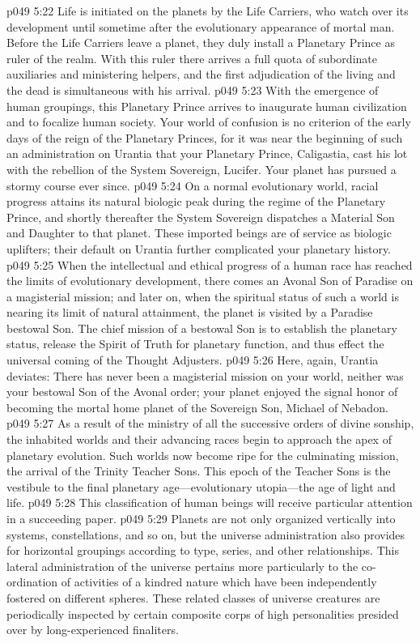 \vs p049 5:22 Life is initiated on the planets by the Life Carriers, who watch over its development until sometime after the evolutionary appearance of mortal man. Before the Life Carriers leave a planet, they duly install a Planetary Prince as ruler of the realm. With this ruler there arrives a full quota of subordinate auxiliaries and ministering helpers, and the first adjudication of the living and the dead is simultaneous with his arrival.
\vs p049 5:23 With the emergence of human groupings, this Planetary Prince arrives to inaugurate human civilization and to focalize human society. Your world of confusion is no criterion of the early days of the reign of the Planetary Princes, for it was near the beginning of such an administration on Urantia that your Planetary Prince, Caligastia, cast his lot with the rebellion of the System Sovereign, Lucifer. Your planet has pursued a stormy course ever since.
\vs p049 5:24 On a normal evolutionary world, racial progress attains its natural biologic peak during the regime of the Planetary Prince, and shortly thereafter the System Sovereign dispatches a Material Son and Daughter to that planet. These imported beings are of service as biologic uplifters; their default on Urantia further complicated your planetary history.
\vs p049 5:25 When the intellectual and ethical progress of a human race has reached the limits of evolutionary development, there comes an Avonal Son of Paradise on a magisterial mission; and later on, when the spiritual status of such a world is nearing its limit of natural attainment, the planet is visited by a Paradise bestowal Son. The chief mission of a bestowal Son is to establish the planetary status, release the Spirit of Truth for planetary function, and thus effect the universal coming of the Thought Adjusters.
\vs p049 5:26 Here, again, Urantia deviates: There has never been a magisterial mission on your world, neither was your bestowal Son of the Avonal order; your planet enjoyed the signal honor of becoming the mortal home planet of the Sovereign Son, Michael of Nebadon.
\vs p049 5:27 As a result of the ministry of all the successive orders of divine sonship, the inhabited worlds and their advancing races begin to approach the apex of planetary evolution. Such worlds now become ripe for the culminating mission, the arrival of the Trinity Teacher Sons. This epoch of the Teacher Sons is the vestibule to the final planetary age---evolutionary utopia---the age of light and life.
\vs p049 5:28 This classification of human beings will receive particular attention in a succeeding paper.
\pc \vs p049 5:29 \bibnobreakspace {} Planets are not only organized vertically into systems, constellations, and so on, but the universe administration also provides for horizontal groupings according to type, series, and other relationships. This lateral administration of the universe pertains more particularly to the co\hyp{}ordination of activities of a kindred nature which have been independently fostered on different spheres. These related classes of universe creatures are periodically inspected by certain composite corps of high personalities presided over by long\hyp{}experienced finaliters.
